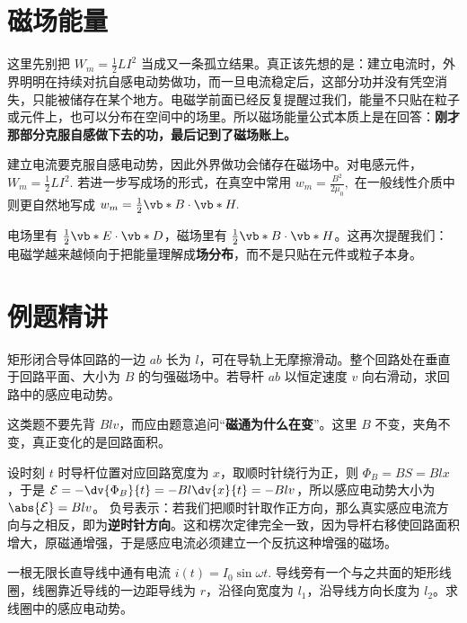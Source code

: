 \documentclass[lang=cn,11pt]{elegantbook}
\newcommand{\bridge}[1]{\begin{note}#1\end{note}}
\begin{document}
\section{磁场能量}

这里先别把 \(W_m=\frac12 LI^2\) 当成又一条孤立结果。真正该先想的是：建立电流时，外界明明在持续对抗自感电动势做功，而一旦电流稳定后，这部分功并没有凭空消失，只能被储存在某个地方。电磁学前面已经反复提醒过我们，能量不只贴在粒子或元件上，也可以分布在空间中的场里。所以磁场能量公式本质上是在回答：\textbf{刚才那部分克服自感做下去的功，最后记到了磁场账上。}

建立电流要克服自感电动势，因此外界做功会储存在磁场中。对电感元件，
 \(W_m=\frac{1}{2}LI^2.\) 
若进一步写成场的形式，在真空中常用
 \(w_m=\frac{B^2}{2\mu_0},\) 
在一般线性介质中则更自然地写成
 \(w_m=\frac{1}{2}\vb*{B}\cdot \vb*{H}.\) 

\bridge{电场里有 \(\frac12 \vb*{E}\cdot \vb*{D}\)，磁场里有 \(\frac12 \vb*{B}\cdot \vb*{H}\)。这再次提醒我们：电磁学越来越倾向于把能量理解成\textbf{场分布}，而不是只贴在元件或粒子本身。}

\section{例题精讲}

\begin{exercise}[滑动导杆的感应电动势]
矩形闭合导体回路的一边 \(ab\) 长为 \(l\)，可在导轨上无摩擦滑动。整个回路处在垂直于回路平面、大小为 \(B\) 的匀强磁场中。若导杆 \(ab\) 以恒定速度 \(v\) 向右滑动，求回路中的感应电动势。
\end{exercise}

\begin{solution}
这类题不要先背 \(Blv\)，而应由题意追问“\textbf{磁通为什么在变}”。这里 \(B\) 不变，夹角不变，真正变化的是回路面积。

设时刻 \(t\) 时导杆位置对应回路宽度为 \(x\)，取顺时针绕行为正，则 \(\Phi_B=BS=Blx\)，于是 \(\mathcal{E}=-\dv{\Phi_B}{t}=-Bl\dv{x}{t}=-Blv\)，所以感应电动势大小为 \(\abs{\mathcal{E}}=Blv\)。
负号表示：若我们把顺时针取作正方向，那么真实感应电流方向与之相反，即为\textbf{逆时针方向}。这和楞次定律完全一致，因为导杆右移使回路面积增大，原磁通增强，于是感应电流必须建立一个反抗这种增强的磁场。
\end{solution}

\begin{exercise}[时变长直电流在线圈中激发的感应电动势]
一根无限长直导线中通有电流
 \(i(t)=I_0\sin\omega t.\) 
导线旁有一个与之共面的矩形线圈，线圈靠近导线的一边距导线为 \(r\)，沿径向宽度为 \(l_1\)，沿导线方向长度为 \(l_2\)。求线圈中的感应电动势。
\end{exercise}
\end{document}
